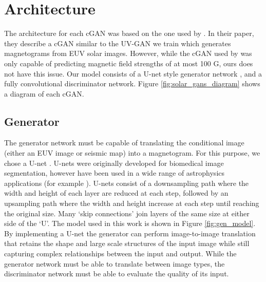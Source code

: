 \documentclass[11pt,a4paper,onecolumn]{report}
\begin{document}
%
%
%
%
%
\section{Architecture}
%
%
%
%
%
%

The architecture for each cGAN was based on the one used by \citet{Kim2019}. In
their paper, they describe a cGAN similar to the UV-GAN we train which generates
magnetograms from EUV solar images. However, while the cGAN used by
\citet{Kim2019} was only capable of predicting magnetic field strengths of at
most 100 G, ours does not have this issue. Our model consists of a U-net style generator network
\citep{ronneberger_u-net_2015}, and a fully convolutional discriminator network. Figure
\ref{fig:solar_gans_diagram} shows a diagram of each cGAN.


\subsection{Generator}
The generator network must be capable of translating the conditional image
(either an EUV image or seismic map) into a magnetogram. For this purpose, we
chose a U-net \citep{ronneberger_u-net_2015}. U-nets were originally developed
for biomedical image segmentation, however have been used in a wide range of
astrophysics applications (for example
\citet{felipe_improved_2019,bekki_quantifying_2021,baso_solar_2019}). U-nets
consist of a downsampling path where the width and height of each layer are
reduced at each step, followed by an upsampling path where the width and height
increase at each step until reaching the original size. Many `skip
connections' join layers of the same size at either side of the `U'. The model used
in this work is shown in Figure \ref{fig:gen_model}. By implementing a U-net the
generator can perform image-to-image translation that retains the shape and
large scale structures of the input image while still capturing complex
relationships between the input and output. While the generator network must be
able to translate between image types, the discriminator network must be able to
evaluate the quality of its input.
\end{document}
